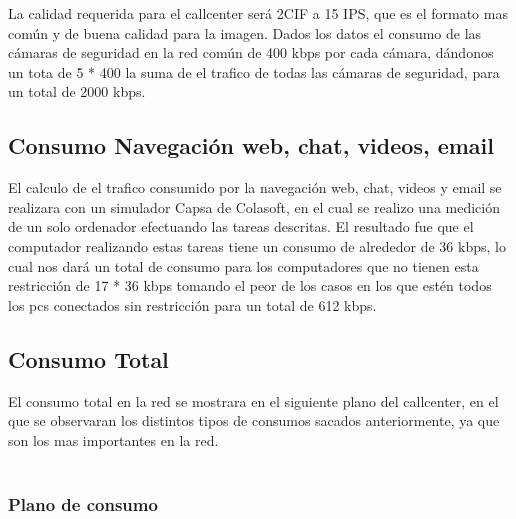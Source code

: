 \documentclass[12pt]{article}
\begin{document}
La calidad requerida para el callcenter será 2CIF a 15 IPS, que es el formato mas común y de buena calidad para la imagen. Dados los datos el consumo de las cámaras de seguridad en la red común de 400 kbps por cada cámara, dándonos un tota de 5 * 400 la suma de el trafico de todas las cámaras de seguridad, para un total de 2000 kbps.

\subsection{\textbf{Consumo Navegación web, chat, videos, email}}
El calculo de el trafico consumido por la navegación web, chat, videos y email se realizara con un simulador Capsa de Colasoft, en el cual se realizo una medición de un solo ordenador efectuando las tareas descritas. El resultado fue que el computador realizando estas tareas tiene un consumo de alrededor de 36 kbps, lo cual nos dará un total de consumo para los computadores que no tienen esta restricción de 17 * 36 kbps tomando el peor de los casos en los que estén todos los pcs conectados sin restricción para un total de 612 kbps.

\subsection{\textbf{Consumo Total}}
El consumo total en la red se mostrara en el siguiente plano del callcenter, en el que se observaran los distintos tipos de consumos sacados anteriormente, ya que son los mas importantes en la red.\\\\
\subsubsection{\textbf{Plano de consumo}}
\begin{center}
\end{center}
\end{document}
